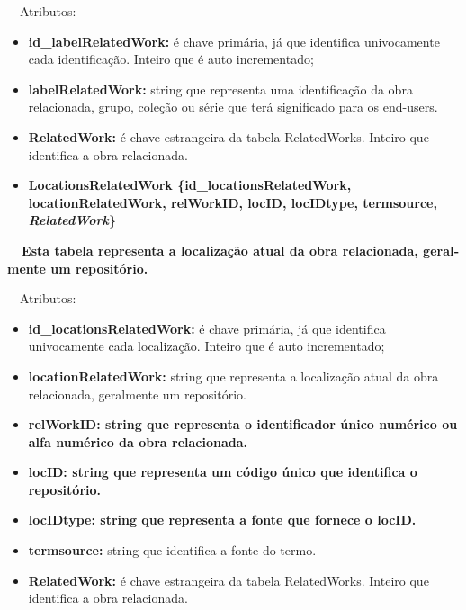 \documentclass[letterpaper]{article}
\newcommand\textstyleStrongEmphasis[1]{\textbf{#1}}
\newcommand\liststyleLi{%
\renewcommand\labelitemi{{\textbullet}}
\renewcommand\labelitemii{[27A2?]}
\renewcommand\labelitemiii{{\textbullet}}
\renewcommand\labelitemiv{{\textbullet}}
}
\newcommand\liststyleLvi{%
\renewcommand\labelitemi{[27A2?]}
\renewcommand\labelitemii{[27A2?]}
\renewcommand\labelitemiii{[27A2?]}
\renewcommand\labelitemiv{[27A2?]}
}
\begin{document}
\bigskip

{
\ \ Atributos:}

\liststyleLvi
\begin{itemize}
\item {
\textbf{id\_}\textbf{labelRelatedWork}\textbf{:} \'e chave prim\'aria,
j\'a que identifica univocamente cada identifica\c{c}\~ao. Inteiro que
\'e auto incrementado;}
\item {
\textbf{labelRelatedWork:} string que representa uma identifica\c{c}\~ao
da obra relacionada, grupo, cole\c{c}\~ao ou s\'erie que ter\'a
significado para os end-users.}
\item {
\textbf{RelatedWork:}\textit{ }\'e chave estrangeira da tabela
RelatedWorks. Inteiro que identifica a obra relacionada.}
\end{itemize}

\bigskip

\liststyleLi
\begin{itemize}
\item {\bfseries
LocationsRelatedWork\textmd{
\{}\textmd{id\_locationsRelatedWork}\textmd{, locationRelatedWork,
relWorkID, locID, }\textmd{locIDtype, termsource,
}\textmd{\textit{RelatedWork}}\textmd{\}}}
\end{itemize}
{\bfseries
\textstyleStrongEmphasis{\foreignlanguage{english}{\textmd{\ \ }}}\foreignlanguage{english}{\textmd{Esta
}}\textstyleStrongEmphasis{\foreignlanguage{english}{\textmd{tabela}}}\foreignlanguage{english}{\textmd{
representa a localiza\c{c}\~ao atual da obra relacionada, geralmente um
reposit\'orio.}}}


\bigskip

{
\ \ Atributos:}

\liststyleLvi
\begin{itemize}
\item {
\textbf{id\_}\textbf{locationsRelatedWork}\textbf{:} \'e chave
prim\'aria, j\'a que identifica univocamente cada localiza\c{c}\~ao.
Inteiro que \'e auto incrementado;}
\item {
\textbf{locationRelatedWork:} string que representa a localiza\c{c}\~ao
atual da obra relacionada, geralmente um reposit\'orio.}
\item {\bfseries
relWorkID:\textmd{ string que representa o identificador \'unico
num\'erico ou alfa num\'erico da obra relacionada.}}
\item {\bfseries
locID: \textmd{string que representa um c\'odigo \'unico que identifica
o reposit\'orio.}}
\item {\bfseries
locIDtype: \textmd{string que representa a fonte que fornece o locID.}}
\item {
\textbf{termsource: }string que identifica a fonte do termo.}
\item {
\textbf{RelatedWork:}\textit{ }\'e chave estrangeira da tabela
RelatedWorks. Inteiro que identifica a obra relacionada.\ \ }
\end{itemize}
\end{document}
